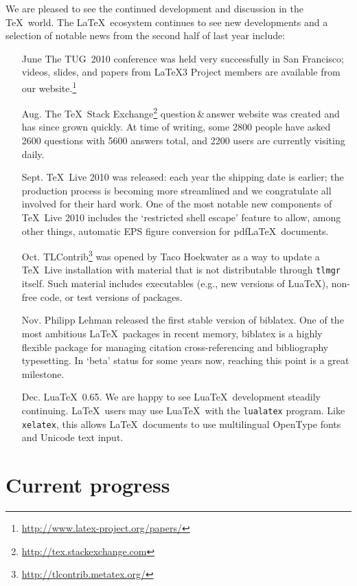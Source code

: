\documentclass{ltnews}
\begin{document}
We are pleased to see the continued development and discussion in the \TeX\ world.
The \LaTeX\ ecosystem continues to see new developments and a selection of notable news from the second half of last year include:
\begin{itemize}
\item[June] The TUG~2010 conference was held very successfully in San
Francisco; videos, slides, and papers from \LaTeX3 Project members are available from our website.\footnote{\url{http://www.latex-project.org/papers/}}
\item[Aug.] 
The \TeX\ Stack Exchange\footnote{\url{http://tex.stackexchange.com}} question\,\&\,answer website was created and has since grown quickly. At time of writing, some 2800 people have asked 2600 questions with 5600 answers total, and 2200 users are currently visiting daily.
\item[Sept.] \TeX\ Live 2010 was released: each year the shipping date is earlier; the production process is becoming more streamlined and we congratulate all involved for their hard work. One of the most notable new components of \TeX\ Live 2010 includes the `restricted shell escape' feature to allow, among other things, automatic EPS figure conversion for pdf\LaTeX\ documents.
\item[Oct.] TLContrib\footnote{\url{http://tlcontrib.metatex.org/}} was opened by Taco Hoekwater as a way to update a \TeX~Live installation with material that is not distributable through \verb|tlmgr| itself. Such material includes executables (e.g., new versions of Lua\TeX), non-free code, or test versions of packages.
\item[Nov.] Philipp Lehman released the first stable version of \textsf{biblatex}. One of the most ambitious \LaTeX\ packages in recent memory, \textsf{biblatex} is a highly flexible package for managing citation cross-referencing and bibliography typesetting. In `beta' status for some years now, reaching this point is a great milestone.
\item[Dec.] Lua\TeX\ 0.65. We are happy to see Lua\TeX\ development steadily continuing. \LaTeX\ users may use Lua\TeX\ with the \verb|lualatex| program. Like \verb|xelatex|, this allows \LaTeX\ documents to use multilingual OpenType fonts and Unicode text input.
\end{itemize}

\section{Current progress}
\end{document}
